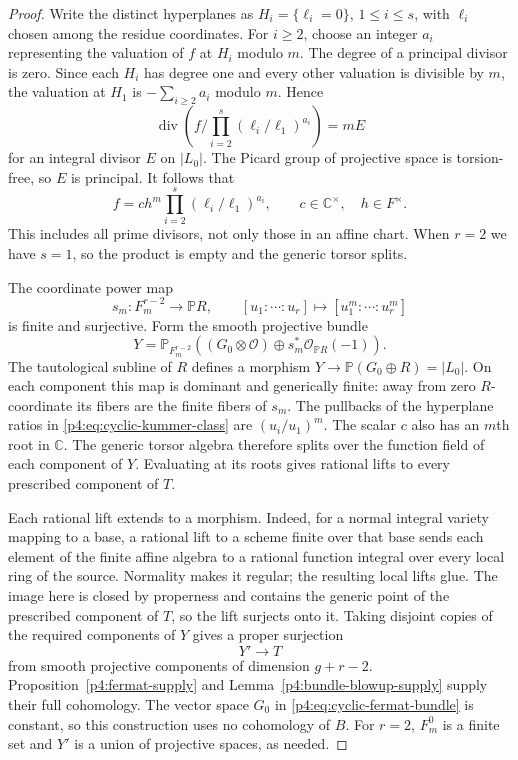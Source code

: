 \documentclass[11pt]{article}
\newcommand{\C}{\mathbb C}
\theoremstyle{plain}
\theoremstyle{definition}
\theoremstyle{remark}
\numberwithin{equation}{section}
\begin{document}
\begin{proof}
Write the distinct hyperplanes as $H_i=\{\ell_i=0\}$,
$1\le i\le s$, with $\ell_i$ chosen among the residue coordinates.
For $i\ge2$, choose an integer $a_i$ representing the valuation
of $f$ at $H_i$ modulo $m$.  The degree of a principal divisor
is zero.  Since each $H_i$ has degree one and every other
valuation is divisible by $m$, the valuation at $H_1$ is
$-\sum_{i\ge2}a_i$ modulo $m$.  Hence
\[
 \operatorname{div}\left(
 f\Big/\prod_{i=2}^s(\ell_i/\ell_1)^{a_i}\right)=mE
\]
for an integral divisor $E$ on $|L_0|$.  The Picard group of
projective space is torsion-free, so $E$ is principal.
It follows that
\begin{equation}
 \label{p4:eq:cyclic-kummer-class}
 f=c h^m\prod_{i=2}^s(\ell_i/\ell_1)^{a_i},
 \qquad c\in\C^\times,\quad h\in F^\times.
\end{equation}
This includes all prime divisors, not only those in an affine
chart.  When $r=2$ we have $s=1$, so the product is empty and
the generic torsor splits.

The coordinate power map
\[
 s_m:F_m^{r-2}\longrightarrow\mathbb P R,\qquad
 [u_1:\cdots:u_r]\longmapsto[u_1^m:\cdots:u_r^m]
\]
is finite and surjective.  Form the smooth projective bundle
\begin{equation}
 \label{p4:eq:cyclic-fermat-bundle}
 Y=\mathbb P_{F_m^{r-2}}
 \left((G_0\otimes\mathcal O)\oplus
              s_m^*\mathcal O_{\mathbb P R}(-1)\right).
\end{equation}
The tautological subline of $R$ defines a morphism
$Y\to\mathbb P(G_0\oplus R)=|L_0|$.  On each component this
map is dominant and generically finite: away from zero
$R$-coordinate its fibers are the finite fibers of $s_m$.
The pullbacks of the hyperplane ratios in
\eqref{p4:eq:cyclic-kummer-class} are $(u_i/u_1)^m$.
The scalar $c$ also has an $m$th root in $\C$.  The generic
torsor algebra therefore splits over the function field of
each component of $Y$.  Evaluating at its roots gives rational
lifts to every prescribed component of $T$.

Each rational lift extends to a morphism.  Indeed, for a normal
integral variety mapping to a base, a rational lift to a scheme
finite over that base sends each element of the finite affine
algebra to a rational function integral over every local ring
of the source.  Normality makes it regular; the resulting local
lifts glue.  The image here is closed by properness and contains
the generic point of the prescribed component of $T$, so the
lift surjects onto it.  Taking disjoint copies of the required
components of $Y$ gives a proper surjection
\begin{equation}
 \label{p4:eq:cyclic-smooth-surjection}
 Y'\longrightarrow T
\end{equation}
from smooth projective components of dimension $g+r-2$.
Proposition~\ref{p4:fermat-supply} and
Lemma~\ref{p4:bundle-blowup-supply} supply their full cohomology.
The vector space $G_0$ in \eqref{p4:eq:cyclic-fermat-bundle}
is constant, so this construction uses no cohomology of $B$.
For $r=2$, $F_m^0$ is a finite set and $Y'$ is a union of
projective spaces, as needed.


\end{proof}
\end{document}

